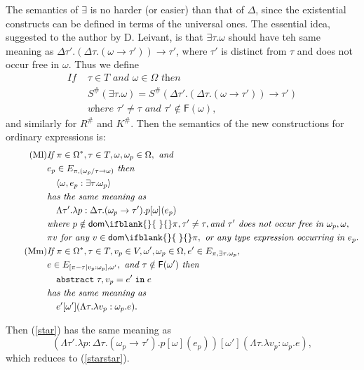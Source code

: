 \documentclass[sigplan,screen,nonacm,balance=false]{acmart}
\theoremstyle{plain}
\DeclarePairedDelimiter{\pair}{\langle}{\rangle}
\newcommand{\abstractin}[4]{\mathtt{abstract} \; #1, #2 = #3 \; \mathtt{in} \; #4}
\newcommand{\dom}[1]{\mathsf{dom}\ifblank{#1}{\;}{#1}}
\newcommand{\FV}{\mathsf{F}}
\begin{document}
The semantics of $\exists$ is no harder (or easier) than that of $\Delta$, since the existential constructs can be defined in terms of the universal ones.
The essential idea, suggested to the author by D. Leivant, is that $\exists \tau. \omega$ should have teh same meaning as $\Delta \tau'. (\Delta \tau. (\omega \to \tau')) \to \tau'$, where $\tau'$ is distinct from $\tau$ and does not occur free in $\omega$.
Thus we define
%
\begin{align*}\tag{S6}
  \textit{If } & \tau \in T \textit{ and } \omega \in \Omega \textit{ then } \\
  & S^\#(\exists \tau. \omega) = S^\#(\Delta \tau'. (\Delta \tau. (\omega \to \tau')) \to \tau') \\
  & \textit{where } \tau' \neq \tau \textit{ and } \tau' \notin \FV(\omega),
\end{align*}
%
and similarly for $R^\#$ and $K^\#$. Then the semantics of the new constructions for ordinary expressions is:
%
\begin{align*}
  \tag{Ml}
  & \textit{If } \pi \in \Omega^*, \tau \in T, \omega, \omega_p \in \Omega, \textit{ and } \\
  & e_p \in E_{\pi, (\omega_p/\tau \to \omega)} \textit{ then } \\
  & \quad \pair{\omega, e_p : \exists \tau. \omega_p} \\
  & \textit{has the same meaning as } \\
  & \quad \Lambda \tau'. \lambda p: \Delta \tau. (\omega_p \to \tau'). p [\omega](e_p) \\
  & \textit{where } p \notin \dom{} \pi, \tau' \neq \tau, \textit{and } \tau' \textit{ does not occur free in } \omega_p, \omega, \\
  & \pi v \textit{ for any } v \in \dom{} \pi, \textit{ or any type expression occurring in } e_p. \\[\parskip]
  \tag{Mm}
  & \textit{If } \pi \in \Omega^*, \tau \in T, v_p \in V, \omega', \omega_p \in \Omega, e' \in E_{\pi, \exists \tau. \omega_p}, \\
  & e \in E_{[\pi - \tau \mid v_p: \omega_p], \omega'}, \textit{ and } \tau \notin \FV(\omega') \textit{ then } \\
  & \quad \abstractin{\tau}{v_p}{e'}{e} \\
  & \textit{has the same meaning as } \\
  & \quad e'[\omega'](\Lambda \tau. \lambda v_p: \omega_p. e).
\end{align*}

Then (\ref{star}) has the same meaning as
%
\begin{equation*}
  (\Lambda \tau'. \lambda p: \Delta \tau. (\omega_p \to \tau'). p[\omega](e_p))[\omega'](\Lambda \tau. \lambda v_p: \omega_p. e),
\end{equation*}
%
which reduces to (\ref{starstar}).
\end{document}
